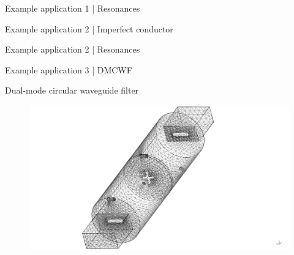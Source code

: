 \documentclass{beamer}
\begin{document}
\begin{frame}{Example application 1 | Resonances}

    \begin{figure}
        \centering
        \scalebox{0.8}{}
    \end{figure}

\end{frame}

\begin{frame}{Example application 2 | Imperfect conductor}

    \begin{figure}
        \centering
        \scalebox{0.8}{}
    \end{figure}

\end{frame}

\begin{frame}{Example application 2 | Resonances}

    \begin{figure}
        \centering
        \scalebox{0.8}{}
    \end{figure}

\end{frame}

\begin{frame}{Example application 3 | DMCWF}

    Dual-mode circular waveguide filter

    \begin{figure}
        \centering
        \includegraphics[scale=0.18, trim=12cm 0.2cm 15cm 0.2cm, clip]{../report/figures/DMCWF_surfacemesh.pdf}
    \end{figure}

\end{frame}
\end{document}
